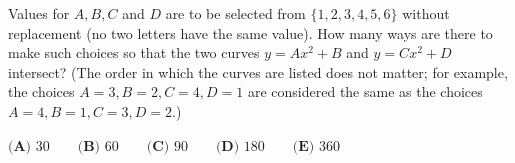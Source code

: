 Values for $A,B,C$ and $D$ are to be selected from $\{1,2,3,4,5,6\}$ without replacement (no two letters have the same value). How many ways are there to make such choices so that the two curves $y=Ax^2+B$ and $y=Cx^2+D$ intersect? (The order in which the curves are listed does not matter; for example, the choices $A=3,B=2,C=4,D=1$ are considered the same as the choices $A=4,B=1,C=3,D=2$.)

$\textbf{(A) }30\qquad\textbf{(B) }60\qquad\textbf{(C) }90\qquad\textbf{(D) }180\qquad\textbf{(E) }360$
